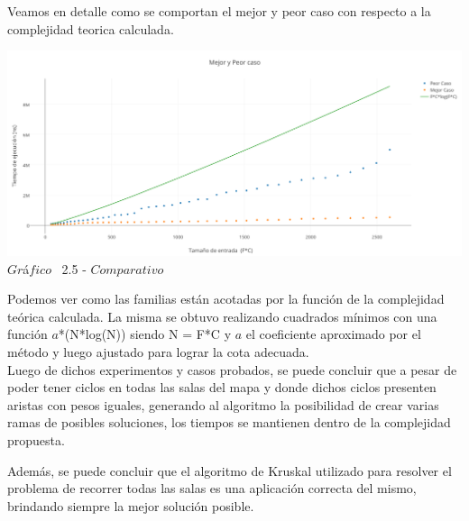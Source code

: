 Veamos en detalle como se comportan el mejor y peor caso con respecto a la complejidad teorica calculada.\\

\vspace*{0.3cm} \vspace*{0.3cm}
  \begin{center}
\includegraphics[scale=0.45]{./EJ2/MejorYPeorCaso.png}
 {$Gr$\'a$fico$ \ 2.5 - $Comparativo$}
  \end{center}
  \vspace*{0.3cm}
  
Podemos ver como las familias est\'an acotadas por la funci\'on de la complejidad te\'orica calculada. La misma se obtuvo realizando cuadrados mínimos con una función $a$*(N*log(N)) siendo N = F*C y $a$ el coeficiente aproximado por el método y luego ajustado para lograr la cota adecuada. \\
  
Luego de dichos experimentos y casos probados, se puede concluir que a pesar de poder tener ciclos en todas las salas del mapa y donde dichos ciclos presenten aristas con pesos iguales, generando al algoritmo la posibilidad de crear varias ramas de posibles soluciones, los tiempos se mantienen dentro de la complejidad propuesta.

Además, se puede concluir que el algoritmo de Kruskal utilizado para resolver el problema de recorrer todas las salas es una aplicación correcta del mismo, brindando siempre la mejor solución posible.
